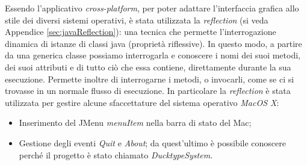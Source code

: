 Essendo l'applicativo \emph{cross-platform}, per poter adattare l'interfaccia grafica
allo stile dei diversi sistemi operativi, è stata utilizzata la \emph{reflection} (si veda Appendice \ref{sec:javaReflection}):
una tecnica che permette l’interrogazione dinamica di istanze di classi java
(proprietà riflessive). In questo modo, a partire da una generica classe possiamo
interrogarla e conoscere i nomi dei suoi metodi, dei suoi attributi e di tutto ciò
che essa contiene, direttamente durante la sua esecuzione. Permette inoltre
 di interrogarne i metodi, o invocarli, come se ci si trovasse in un normale flusso di esecuzione.
In particolare la \emph{reflection} è stata utilizzata per gestire alcune sfaccettature del sistema operativo
\emph{MacOS X}: 
\begin{itemize}
	\item Inserimento del JMenu \emph{menuItem} nella barra di stato del Mac;
	\item Gestione degli eventi \emph{Quit} e \emph{About}; da quest'ultimo è possibile conoscere
	perché il progetto è stato chiamato \emph{DucktypeSystem.}
\end{itemize}
